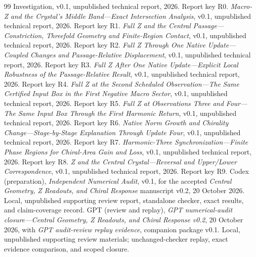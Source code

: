 \documentclass[11pt,a4paper]{article}
\numberwithin{equation}{section}
\begin{document}
\begin{thebibliography}{99}
{Investigation}, v0.1, unpublished technical report, 2026. Report key R0.
\emph{Macro-Z and the Crystal's Middle Band---Exact Intersection Analysis},
v0.1, unpublished technical report, 2026. Report key R1.
\emph{Full Z and the Central Passage---Constriction, Threefold Geometry and
Finite-Region Contact}, v0.1, unpublished technical report, 2026. Report key R2.
\emph{Full Z Through One Native Update---Coupled Changes and Passage-Relative
Displacement}, v0.1, unpublished technical report, 2026. Report key R3.
\emph{Full Z After One Native Update---Explicit Local Robustness of the
Passage-Relative Result}, v0.1, unpublished technical report, 2026. Report key R4.
\emph{Full Z at the Second Scheduled Observation---The Same Certified Input
Box in the First Negative Macro Sector}, v0.1, unpublished technical report,
2026. Report key R5.
\emph{Full Z at Observations Three and Four---The Same Input Box Through
the First Harmonic Return}, v0.1, unpublished technical report, 2026.
Report key R6.
\emph{Native Norm Growth and Chirality Change---Stage-by-Stage Explanation
Through Update Four}, v0.1, unpublished technical report,
2026. Report key R7.
\emph{Harmonic-Three Synchronization---Finite Phase Regions for Chiral-Area
Gain and Loss}, v0.1, unpublished technical report, 2026. Report key R8.
\emph{Z and the Central Crystal---Reversal and Upper/Lower Correspondence}, v0.1,
unpublished technical report, 2026. Report key R9.
Codex (preparation), \emph{Independent Numerical Audit}, v0.1, for the
accepted \emph{Central Geometry, Z Readouts, and Chiral Response} manuscript
v0.2, 20 October 2026. Local, unpublished supporting review report,
standalone checker, exact results, and claim-coverage record.
GPT (review and replay), \emph{GPT numerical-audit closure---Central Geometry,
Z Readouts, and Chiral Response v0.2}, 20 October 2026, with
\emph{GPT audit-review replay evidence}, companion package v0.1.
Local, unpublished supporting review materials; unchanged-checker replay,
exact evidence comparison, and scoped closure.
\end{thebibliography}
\end{document}
